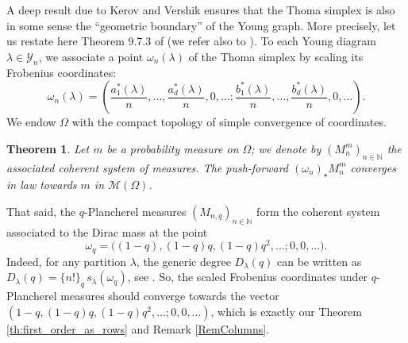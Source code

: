 \documentclass[10pt]{amsart}
\newtheorem{theorem}{Theorem}
\theoremstyle{remark}
\newcommand{\N}{\mathbb{N}}
\newcommand{\young}{\mathscr{Y}}
\begin{document}
A deep result due to Kerov and Vershik ensures that the Thoma simplex is also in some sense the ``geometric boundary'' of the Young graph. More precisely, let us restate here Theorem 9.7.3 of \cite{KOV04} (we refer also to \cite{KV81}). To each Young diagram $\lambda \in \young_{n}$, we associate a point $\omega_{n}(\lambda)$ of the Thoma simplex by scaling its Frobenius coordinates:
$$\omega_{n}(\lambda)=\left(\frac{a_{1}^{*}(\lambda)}{n},\ldots,\frac{a_{d}^{*}(\lambda)}{n},0,\ldots ;\frac{b_{1}^{*}(\lambda)}{n},\ldots,\frac{b_{d}^{*}(\lambda)}{n},0,\ldots\right).$$
We endow $\Omega$ with the compact topology of simple convergence of coordinates.
\begin{theorem}
Let $m$ be a probability measure on $\Omega$; we denote by $(M^{m}_{n})_{n \in \N}$ the associated coherent system of measures. The push-forward $(\omega_{n})_{\star}M^{m}_{n}$ converges in law towards $m$ in $\mathscr{M}(\Omega)$.
\end{theorem}\bigskip

That said, the $q$-Plancherel measures $(M_{n,q})_{n \in \N}$ form the coherent system associated to the Dirac mass at the point 
$$\omega_{q}=\big((1-q),(1-q)q,(1-q)q^{2},\ldots;0,0,\ldots\big).$$
Indeed, for any partition $\lambda$, the generic degree $D_{\lambda}(q)$ can be written as $D_{\lambda}(q)=\{n!\}_{q}\,s_{\lambda}(\omega_{q}) $, see \cite[Chapter 1,\S3, examples 1-5]{Mac95}. So, the scaled Frobenius coordinates under $q$-Plancherel measures should converge towards the vector $(1-q,(1-q)q,(1-q)q^{2},\ldots;0,0,\dots)$, which is exactly our Theorem \ref{th:first_order_as_rows} and Remark \ref{RemColumns}.
\bigskip

\end{document}
